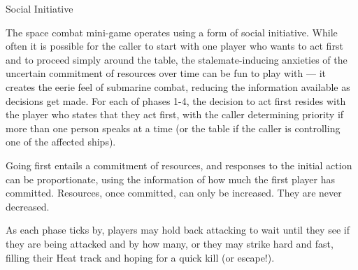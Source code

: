 \vfil\begin{sidebox}{Social Initiative}

\label{sec:Social Initiative}

The space combat mini-game operates using a form of social initiative. While often it is possible for the caller to start with one player who wants to act first and to proceed simply around the table, the stalemate-inducing anxieties of the uncertain commitment of resources over time can be fun to play with --- it creates the eerie feel of submarine combat, reducing the information available as decisions get made. For each of phases 1-4, the decision to act first resides with the player who states that they act first, with the caller determining priority if more than one person speaks at a time (or the table if the caller is controlling one of the affected ships).


Going first entails a commitment of resources, and responses to the initial action can be proportionate, using the information of how much the first player has committed.
Resources, once committed, can only be increased.
They are never decreased.

As each phase ticks by, players may hold back attacking to wait until they see if they are being attacked and by how many, or they may strike hard and fast, filling their Heat track and hoping for a quick kill (or escape!).
\end{sidebox}
